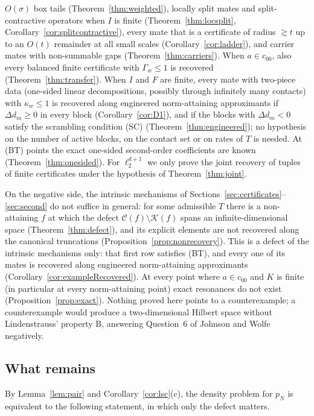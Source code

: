 \documentclass[10pt]{amsart}
\theoremstyle{definition}
\theoremstyle{remark}
\newcommand{\Cset}{\mathcal C}
\begin{document}
$O(\sigma)$ box tails (Theorem~\ref{thm:weighted}), locally split mates and
split-contractive operators when $I$ is finite (Theorem~\ref{thm:locsplit},
Corollary~\ref{cor:splitcontractive}), every mate that is a certificate of
radius $\gtrsim t$ up to an $O(t)$ remainder at all small scales
(Corollary~\ref{cor:ladder}), and carrier mates with non-summable gaps
(Theorem~\ref{thm:carriers}).  When $a\in c_{00}$, also every balanced
finite certificate with $\Gamma_w\le1$ is recovered
(Theorem~\ref{thm:transfer}).  When $I$ and $F$ are finite, every mate with
two-piece data (one-sided linear decompositions, possibly through infinitely
many contacts) with $\kappa_w\le1$ is recovered along engineered
norm-attaining approximants if $\Delta d_m\ge0$ in every block
(Corollary~\ref{cor:D1}), and if the blocks with $\Delta d_m<0$ satisfy the
scrambling condition \textup{(SC)} (Theorem~\ref{thm:engineered}); no
hypothesis on the number of active blocks, on the contact set or on rates of
$T$ is needed.  At \textup{(BT)} points the exact one-sided second-order
coefficients are known (Theorem~\ref{thm:onesided}).  For $\ell_2^{d+1}$ we
only prove the joint recovery of tuples of finite certificates under the
hypothesis of Theorem~\ref{thm:joint}.

On the negative side, the intrinsic mechanisms of
Sections~\ref{sec:certificates}--\ref{sec:second} do not suffice in general:
for some admissible $T$ there is a non-attaining $f$ at which the defect
$\Cset(f)\setminus\mathcal K(f)$ spans an infinite-dimensional space
(Theorem~\ref{thm:defect}), and its explicit elements are not recovered
along the canonical truncations (Proposition~\ref{prop:nonrecovery}).  This
is a defect of the intrinsic mechanisms only: that first row satisfies
\textup{(BT)}, and every one of its mates is recovered along engineered
norm-attaining approximants (Corollary~\ref{cor:exampleRecovered}).  At
every point where $a\in c_{00}$ and $K$ is finite (in particular at every
norm-attaining point) exact resonances do not exist
(Proposition~\ref{prop:exact}).  Nothing proved here points to a
counterexample; a counterexample would produce a two-dimensional Hilbert
space without Lindenstrauss' property B, answering Question~6 of Johnson and
Wolfe \cite{JW} negatively.

\subsection{What remains}
By Lemma~\ref{lem:pair} and Corollary~\ref{cor:lsc}(c), the density problem
for $p_N$ is equivalent to the following statement, in which only the defect
matters.
\end{document}
